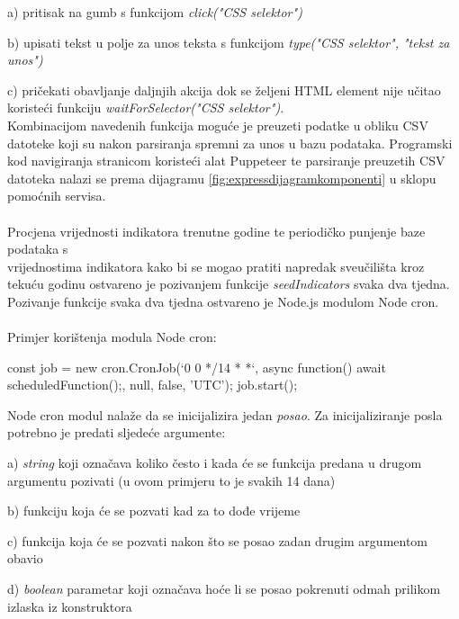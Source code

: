 \documentclass[times, utf8, zavrsni]{fer}
\begin{document}
    a) pritisak na gumb s funkcijom \emph{click("CSS selektor")}

    b) upisati tekst u polje za unos teksta s funkcijom \emph{type("CSS selektor", "tekst za unos")}

    c) pričekati obavljanje daljnjih akcija dok se željeni HTML element nije učitao koristeći funkciju \emph{waitForSelector("CSS selektor")}.
\\Kombinacijom navedenih funkcija moguće je preuzeti podatke u obliku CSV datoteke koji su nakon parsiranja spremni za unos u bazu podataka.
Programski kod navigiranja stranicom koristeći alat Puppeteer te parsiranje preuzetih CSV datoteka nalazi se prema 
dijagramu \ref{fig:expressdijagramkomponenti} u sklopu pomoćnih servisa.
\\\\Procjena vrijednosti indikatora trenutne godine te periodičko punjenje baze podataka s \\vrijednostima indikatora kako bi se mogao pratiti napredak 
sveučilišta kroz tekuću godinu ostvareno je pozivanjem funkcije \emph{seedIndicators} svaka dva tjedna. Pozivanje funkcije svaka dva tjedna 
ostvareno je Node.js modulom Node cron. 
\\\\Primjer korištenja modula Node cron:
\begin{verbnobox}[\fontsize{10pt}{10pt}\selectfont] 
    const job = new cron.CronJob(`0 0 */14 * *`, 
                            async function() {
                await scheduledFunction();}, 
                null, false, 'UTC');
    job.start();
\end{verbnobox}  
Node cron modul nalaže da se inicijalizira jedan \emph{posao}. Za inicijaliziranje posla potrebno je predati sljedeće argumente:

    a) \emph{string} koji označava koliko često i kada će se funkcija predana u drugom argumentu pozivati (u ovom primjeru to je svakih 14 dana)

    b) funkciju koja će se pozvati kad za to dođe vrijeme

    c) funkcija koja će se pozvati nakon što se posao zadan drugim argumentom obavio 

    d) \emph{boolean} parametar koji označava hoće li se posao pokrenuti odmah prilikom izlaska iz konstruktora
\end{document}
